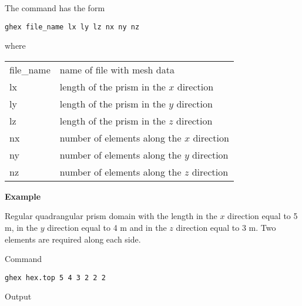 \documentclass[12pt]{book}
\begin{document}
\vspace{2mm}
\noindent
The command has the form

{\tt ghex file\_name lx ly lz nx ny nz}

\vspace{2mm}
\noindent
where

\vspace{2mm}
\noindent
\begin{center}
\begin{tabular}{ll}
file\_name & name of file with mesh data
\\
lx & length of the prism in the $x$ direction
\\
ly & length of the prism in the $y$ direction
\\
lz & length of the prism in the $z$ direction
\\
nx & number of elements along the $x$ direction
\\
ny & number of elements along the $y$ direction
\\
nz & number of elements along the $z$ direction
\end{tabular}
\end{center}

\vspace{3mm}
\noindent
{\bf Example}

\noindent
Regular quadrangular prism domain with the length in the $x$ direction equal to 5 m, in the
$y$ direction equal to 4 m and in the $z$ direction equal to 3 m. Two elements are required along each side.

\noindent
Command

{\tt ghex hex.top 5 4 3 2 2 2}

\noindent
Output
\end{document}
